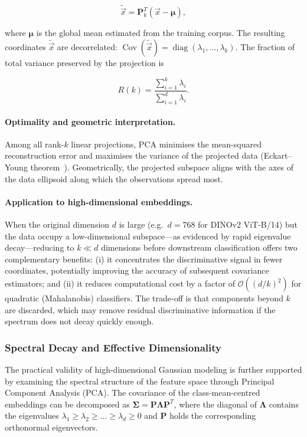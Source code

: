 \begin{equation}
\tilde{\vec{x}} = \mathbf{P}_k^{T}(\vec{x} - \boldsymbol{\mu}),
\label{eq:pca_project}
\end{equation}

where $\boldsymbol{\mu}$ is the global mean estimated from the training corpus. The resulting coordinates $\tilde{\vec{x}}$ are decorrelated: $\operatorname{Cov}(\tilde{\vec{x}}) = \operatorname{diag}(\lambda_1, \ldots, \lambda_k)$. The fraction of total variance preserved by the projection is

\begin{equation}
R(k) = \frac{\sum_{i=1}^{k}\lambda_i}{\sum_{i=1}^{d}\lambda_i}.
\end{equation}

\paragraph{Optimality and geometric interpretation.}
Among all rank-$k$ linear projections, PCA minimises the mean-squared reconstruction error and maximises the variance of the projected data (Eckart--Young theorem~\cite{eckart1936approximation}). Geometrically, the projected subspace aligns with the axes of the data ellipsoid along which the observations spread most.

\paragraph{Application to high-dimensional embeddings.}
When the original dimension $d$ is large (e.g.\ $d=768$ for DINOv2 ViT-B/14) but the data occupy a low-dimensional subspace---as evidenced by rapid eigenvalue decay---reducing to $k \ll d$ dimensions before downstream classification offers two complementary benefits: (i) it concentrates the discriminative signal in fewer coordinates, potentially improving the accuracy of subsequent covariance estimators; and (ii) it reduces computational cost by a factor of $\mathcal{O}((d/k)^2)$ for quadratic (Mahalanobis) classifiers. The trade-off is that components beyond $k$ are discarded, which may remove residual discriminative information if the spectrum does not decay quickly enough.

\subsubsection{Spectral Decay and Effective Dimensionality}

The practical validity of high-dimensional Gaussian modeling is further supported by examining the spectral structure of the feature space through Principal Component Analysis (PCA). The covariance of the class-mean-centred embeddings can be decomposed as $\boldsymbol{\Sigma} = \mathbf{P}\boldsymbol{\Lambda}\mathbf{P}^T$, where the diagonal of $\boldsymbol{\Lambda}$ contains the eigenvalues $\lambda_1 \ge \lambda_2 \ge \dots \ge \lambda_d \ge 0$ and $\mathbf{P}$ holds the corresponding orthonormal eigenvectors.

